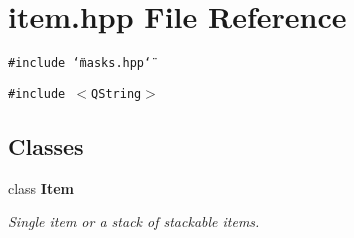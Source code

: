 \section{item.hpp File Reference}
\label{item_8hpp}
{\tt \#include \char`\"{}masks.hpp\char`\"{}}\par
{\tt \#include $<$QString$>$}\par
\subsection*{Classes}
\begin{CompactItemize}
\item 
class {\bf Item}
\begin{CompactList}\small\item\em Single item or a stack of stackable items. \item\end{CompactList}\end{CompactItemize}

